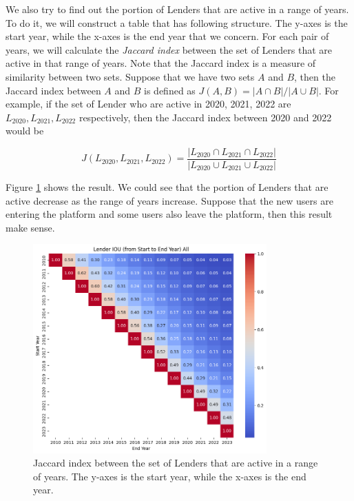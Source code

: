 We also try to find out the portion of Lenders that are active in a range of years.
To do it, we will construct a table that has following structure.
The y-axes is the start year,
while the x-axes is the end year that we concern.
For each pair of years, we will calculate the \textit{Jaccard index}
between the set of Lenders that are active in that range of years.
Note that the Jaccard index is a measure of similarity between two sets.
Suppose that we have two sets $A$ and $B$,
then the Jaccard index between $A$ and $B$ is defined as
$J(A, B) = |A \cap B|/|A \cup B|$.
For example, if the set of Lender who are active in 2020, 2021, 2022 are
$L_{2020}, L_{2021}, L_{2022}$ respectively,
then the Jaccard index between 2020 and 2022 would be

\begin{equation}
	J(L_{2020}, L_{2021}, L_{2022}) = \frac{|L_{2020} \cap L_{2021} \cap L_{2022}|}{|L_{2020} \cup L_{2021} \cup L_{2022}|}
\end{equation}


Figure \ref{fig:active-fromto} shows the result.
We could see that the portion of Lenders that are active decrease as the range of years increase.
Suppose that the new users are entering the platform and some users also leave the platform,
then this result make sense.


\begin{figure}[H]
	\centering
	\includegraphics[width=0.8\textwidth]{images/active-fromto.png}
	\caption[Jaccard index between the set of Lenders that are active in a range of years.]{
		Jaccard index between the set of Lenders that are active in a range of years.
		The y-axes is the start year, while the x-axes is the end year.
	}
	\label{fig:active-fromto}
\end{figure}

